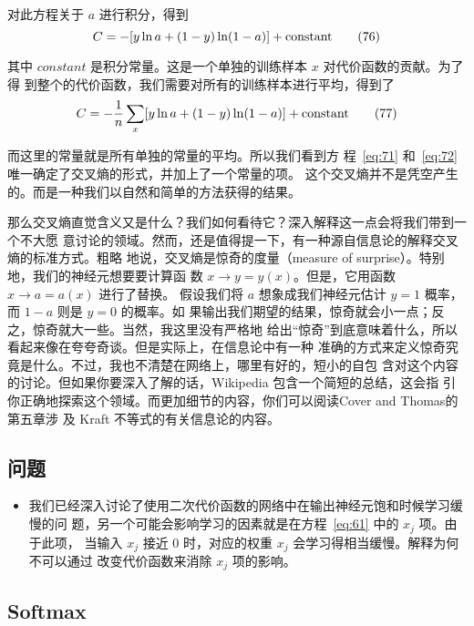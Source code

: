 对此方程关于 $a$ 进行积分，得到 
\begin{equation}
  C = -[y \ln a + (1-y) \ln (1-a)]+ {\rm constant}
  \label{eq:76}\tag{76}
\end{equation}

其中 $constant$ 是积分常量。这是一个单独的训练样本 $x$ 对代价函数的贡献。为了得
到整个的代价函数，我们需要对所有的训练样本进行平均，得到了
\begin{equation}
  C = -\frac{1}{n} \sum_x [y \ln a +(1-y) \ln(1-a)] + {\rm constant}
  \label{eq:77}\tag{77}
\end{equation}

而这里的常量就是所有单独的常量的平均。所以我们看到方
程~\eqref{eq:71} 和~\eqref{eq:72} 唯一确定了交叉熵的形式，并加上了一个常量的项。
这个交叉熵并不是凭空产生的。而是一种我们以自然和简单的方法获得的结果。

那么交叉熵直觉含义又是什么？我们如何看待它？深入解释这一点会将我们带到一个不大愿
意讨论的领域。然而，还是值得提一下，有一种源自信息论的解释交叉熵的标准方式。粗略
地说，交叉熵是惊奇的度量（measure of surprise）。特别地，我们的神经元想要要计算函
数 $x \rightarrow y = y(x)$。但是，它用函数 $x \rightarrow a = a(x)$ 进行了替换。
假设我们将 $a$ 想象成我们神经元估计 $y = 1$ 概率，而 $1-a$ 则是 $y=0$ 的概率。如
果输出我们期望的结果，惊奇就会小一点；反之，惊奇就大一些。当然，我这里没有严格地
给出“惊奇”到底意味着什么，所以看起来像在夸夸奇谈。但是实际上，在信息论中有一种
准确的方式来定义惊奇究竟是什么。不过，我也不清楚在网络上，哪里有好的，短小的自包
含对这个内容的讨论。但如果你要深入了解的话，Wikipedia 包含一个简短的总结，这会指
引你正确地探索这个领域。而更加细节的内容，你们可以阅读Cover and Thomas的第五章涉
及 Kraft 不等式的有关信息论的内容。

\subsection*{问题}

\begin{itemize}
\item 我们已经深入讨论了使用二次代价函数的网络中在输出神经元饱和时候学习缓慢的问
  题，另一个可能会影响学习的因素就是在方程~\eqref{eq:61} 中的 $x_j$ 项。由于此项，
  当输入 $x_j$ 接近 $0$ 时，对应的权重 $x_j$ 会学习得相当缓慢。解释为何不可以通过
  改变代价函数来消除 $x_j$ 项的影响。
\end{itemize}

\subsection{Softmax}

